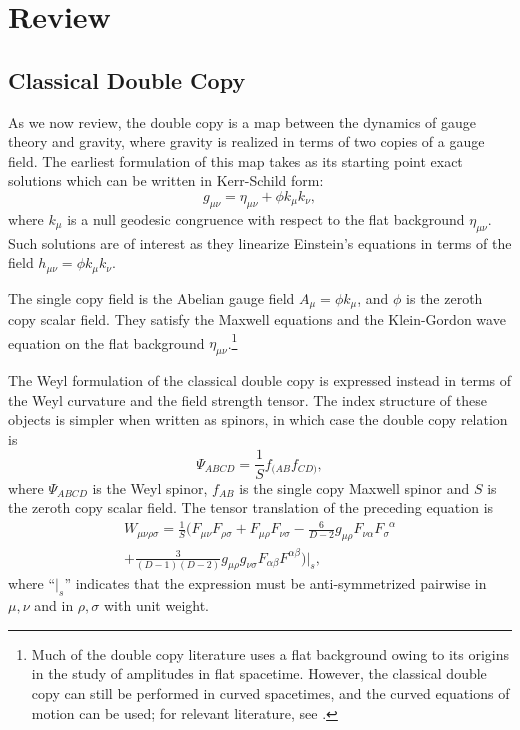 \section{Review}\label{5D:sec:review}

\subsection{Classical Double Copy}\label{5D:sec:ReviewDC}
As we now review, the double copy is a map between the dynamics of gauge theory and gravity, where gravity is realized in terms of two copies of a gauge field. 
The earliest formulation \cite{Monteiro:2014cda} of this map takes as its starting point exact solutions which can be written in Kerr-Schild form:
%
\begin{equation} \label{5D:Kerr-SchildMetric} 
    g_{\mu \nu} = \eta_{\mu \nu} + \phi k_{\mu} k_{\nu},
\end{equation}
%
where $k_{\mu}$ is a null geodesic congruence with respect to the flat background
$\eta_{\mu \nu}$. Such solutions are of interest as they linearize Einstein's equations in terms of the field
$h_{\mu \nu} = \phi k_{\mu} k_{\nu}$.

The single copy field is the Abelian gauge field $A_{\mu} = \phi k_{\mu}$, and $\phi$ is the zeroth copy
scalar field. They satisfy the Maxwell equations and the Klein-Gordon wave equation on the flat background $\eta_{\mu
\nu}$.\footnote{ \label{5D:FlatVCurvedFootnote}  Much of the double copy
literature uses a flat background owing to its origins in the study of amplitudes in flat spacetime. However, the classical double copy can still be performed in curved spacetimes, and the curved equations of motion can be used; for relevant literature, see \cite{Alawadhi:2020jrv, Gurses:2018ckx,Bahjat-Abbas:2017htu,
Carrillo-Gonzalez:2017iyj, Prabhu:2020avf, Adamo:2017nia, Alkac:2021bav, Han:2022mze,Han:2022ubu}.
}

The Weyl formulation \cite{Luna:2018dpt} of
the classical double copy is expressed instead in terms of the Weyl curvature and the field strength tensor.
The index structure of these objects is simpler when written as spinors, in which case the double copy relation is
%
\begin{equation} \label{5D:WeylSpinorDoubleCopyRelation} 
    \Psi_{ABCD} = \frac{1}{S} f_{(AB} f_{CD)},
\end{equation}
%
where $\Psi_{ABCD}$ is the Weyl spinor, $f_{AB}$ is the single copy Maxwell spinor and $S$ is the zeroth copy
scalar field. The tensor translation of the preceding equation is \cite{Alawadhi:2019urr, Alawadhi:2020jrv}
%
\begin{multline} \label{5D:WeylDoublingRelation} 
    W_{\mu \nu \rho \sigma} = \frac{1}{S} \Big( F_{\mu \nu} F_{\rho \sigma} + F_{\mu \rho} F_{\nu \sigma} -
    \frac{6}{D-2} g_{\mu \rho} F_{\nu \alpha} F_{\sigma}^{\phantom{\sigma}\alpha} \\
    + \frac{3}{(D-1)(D-2)}
g_{\mu \rho} g_{\nu \sigma} F_{\alpha \beta} F^{\alpha \beta}\Big) \bigg\vert_{s},
\end{multline}
%
where ``$ \big\vert_{s}$'' indicates that the expression must be anti-symmetrized pairwise in $\mu, \nu$ and in
$\rho, \sigma$ with unit weight.

